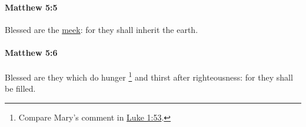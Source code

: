		\paragraph{Matthew 5:5} %
			\label{MATTHEW-5-5}

			Blessed are the \hyperref[MEEKNESS]{meek}: for they shall inherit the earth.

			\begin{framed}
			\scriptsize
				\begin{compactdesc}
					\item[SBLG] \hyperref[MAKARIOS]{}  \hyperref[PRAUS]{}
				\end{compactdesc}
			\end{framed}

		\paragraph{Matthew 5:6} %
			\label{MATTHEW-5-6}

			Blessed are they which do hunger%
				\footnote{%
					Compare Mary's comment in \hyperref[LUKE-1-53]{Luke 1:53}.
					}
			and thirst after righteousness: for they shall be filled.


